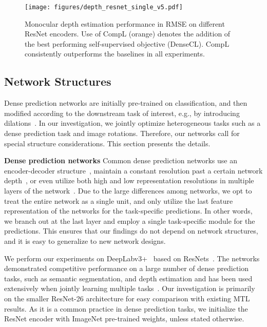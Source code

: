 \documentclass[10pt,twocolumn,letterpaper]{article}
\newcommand{\parsection}[1]{\vspace{1mm}\noindent\textbf{#1 }}
\begin{document}
\begin{figure*}[ht]
 \centering
    \texttt{[image: figures/depth\_resnet\_single\_v5.pdf]}
\caption{Monocular depth estimation performance in RMSE on different ResNet encoders. Use of CompL (orange) denotes the addition of the best performing self-supervised objective (DenseCL). CompL consistently outperforms the baselines in all experiments.}
\label{fig:depth_encoders}
\vspace{-0.2in}
\end{figure*}


\subsection{Network Structures}
\label{architecture}

Dense prediction networks are initially pre-trained on classification, and then modified according to the downstream task of interest, e.g., by introducing dilations~\cite{yu2015multi}. 
In our investigation, we jointly optimize heterogeneous tasks such as a dense prediction task and image rotations. 
Therefore, our networks call for special structure considerations. 
This section presents the details.

\parsection{Dense prediction networks}
Common dense prediction networks use an encoder-decoder structure~\cite{ronneberger2015u,badrinarayanan2017segnet}, maintain a constant resolution past a certain network depth~\cite{yu2017dilated}, or even utilize both high and low representation resolutions in multiple layers of the network~\cite{wang2020deep}. 
Due to the large differences among networks, we opt to treat the entire network as a single unit, and only utilize the last feature representation of the networks for the task-specific predictions. 
In other words, we branch out at the last layer and employ a single task-specific module for the predictions.
This ensures that our findings do not depend on network structures, and it is easy to generalize to new network designs.

We perform our experiments on DeepLabv3+~\cite{chen2018encoder} based on ResNets~\cite{he2016deep}. The networks demonstrated competitive performance on a large number of dense prediction tasks, such as semantic segmentation, and depth estimation and has been used extensively when jointly learning multiple tasks~\cite{maninis2019attentive,bruggemann2020automated}. 
Our investigation is primarily on the smaller ResNet-26 architecture for easy comparison with existing MTL results.
As it is a common practice in dense prediction tasks, we initialize the ResNet encoder with ImageNet pre-trained weights, unless stated otherwise.
\end{document}
